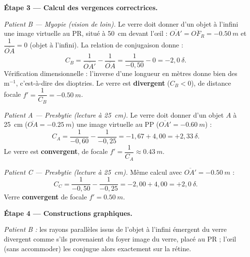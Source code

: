 \documentclass[11pt]{article}
\begin{document}
\begin{exoresolu}
\textbf{Étape 3 — Calcul des vergences correctrices.}

\emph{Patient B — Myopie (vision de loin).} Le verre doit donner d'un objet à l'infini une image virtuelle au PR, situé à \SI{50}{cm} devant l'œil : $\overline{OA'} = \overline{OF_R} = -\SI{0,50}{m}$ et $\dfrac{1}{\overline{OA}} = 0$ (objet à l'infini). La relation de conjugaison donne :
\[ C_B = \frac{1}{\overline{OA'}} - \frac{1}{\overline{OA}} = \frac{1}{-0,50} - 0 = -2,0\ \delta. \]
Vérification dimensionnelle : l'inverse d'une longueur en mètres donne bien des $\mathrm{m}^{-1}$, c'est-à-dire des dioptries. Le verre est \textbf{divergent} ($C_B < 0$), de distance focale $f' = \dfrac{1}{C_B} = -\SI{0,50}{m}$.

\emph{Patient A — Presbytie (lecture à \SI{25}{cm}).} Le verre doit donner d'un objet $A$ à \SI{25}{cm} ($\overline{OA} = -\SI{0,25}{m}$) une image virtuelle au PP ($\overline{OA'} = -\SI{0,60}{m}$) :
\[ C_A = \frac{1}{-0,60} - \frac{1}{-0,25} = -1,67 + 4,00 = +2,33\ \delta. \]
Le verre est \textbf{convergent}, de focale $f' = \dfrac{1}{C_A} \approx \SI{0,43}{m}$.

\emph{Patient C — Presbytie (lecture à \SI{25}{cm}).} Même calcul avec $\overline{OA'} = -\SI{0,50}{m}$ :
\[ C_C = \frac{1}{-0,50} - \frac{1}{-0,25} = -2,00 + 4,00 = +2,0\ \delta. \]
Verre \textbf{convergent} de focale $f' = \SI{0,50}{m}$.

\textbf{Étape 4 — Constructions graphiques.}

\emph{Patient B :} les rayons parallèles issus de l'objet à l'infini émergent du verre divergent comme s'ils provenaient du foyer image du verre, placé au PR ; l'œil (sans accommoder) les conjugue alors exactement sur la rétine.


\end{exoresolu}
\end{document}
